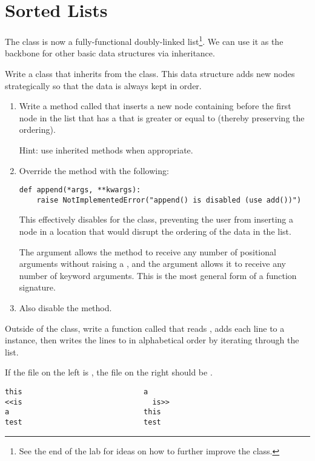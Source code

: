 \section*{Sorted Lists} %

The  class is now a fully-functional doubly-linked list\footnote{See the end of the lab for ideas on how to further improve the  class.}.
We can use it as the backbone for other basic data structures via inheritance.

\begin{problem} %
Write a  class that inherits from the  class.
This data structure adds new nodes strategically so that the data is always kept in order.
\begin{enumerate}
\item Write a method called  that inserts a new node containing  before the first node in the list that has a  that is greater or equal to  (thereby preserving the ordering).

Hint: use inherited methods when appropriate.
\item Override the  method with the following:

\begin{lstlisting}
def append(*args, **kwargs):
    raise NotImplementedError("append() is disabled (use add())")
\end{lstlisting} %

This effectively disables  for the  class, preventing the user from inserting a node in a location that would disrupt the ordering of the data in the list.

\begin{info}
The  argument allows the  method to receive any number of positional arguments without raising a , and the  argument allows it to receive any number of keyword arguments.
This is the most general form of a function signature.
\end{info}

\item Also disable the  method.

\end{enumerate}
Outside of the class, write a function called  that reads , adds each line to a  instance, then writes the lines to  in alphabetical order by iterating through the list.

If the file on the left is , the file on the right should be .
\begin{lstlisting}
this                            a
<<is                              is>>
a                               this
test                            test
\end{lstlisting}

\label{prob:sortedlist}
\end{problem}

